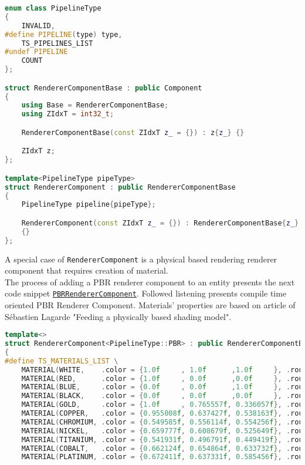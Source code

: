 \begin{itemize}
\begin{lstlisting}[language=c++, caption=Renderer Component struct (./engine/include/tsengine/ecs/components/renderer\_component.h)]
enum class PipelineType
{
    INVALID,
#define PIPELINE(type) type, 
    TS_PIPELINES_LIST
#undef PIPELINE
    COUNT
};

struct RendererComponentBase : public Component
{
    using Base = RendererComponentBase;
    using ZIdxT = int32_t;

    RendererComponentBase(const ZIdxT z_ = {}) : z{z_} {}

    ZIdxT z;
};

template<PipelineType pipeType>
struct RendererComponent : public RendererComponentBase 
{
    PipelineType pipeline{pipeType};

    RendererComponent(const ZIdxT z_ = {}) : RendererComponentBase{z_}
    {}
};
\end{lstlisting}

A special case of \texttt{RendererComponent} is a physical based rendering renderer component that requires creation of material.\\
The process of adding a PBR renderer component to an entity presents the next code snippet \hyperref[lst:renderer_component_pbr]{\texttt{PBRRendererComponent}}.
Followed listening presents compile time oriented PBR Renderer Component. Materials' properties are based on article of Sébastien Lagarde "Feeding a physically based shading model"\cite{feedingpbr}.
\label{lst:renderer_component_pbr}
\begin{lstlisting}[language=c++, caption=Renderer PBR component struct (./engine/include/tsengine/ecs/components/renderer\_component.h)]
template<>
struct RendererComponent<PipelineType::PBR> : public RendererComponentBase
{
#define TS_MATERIALS_LIST \
    MATERIAL(WHITE,    .color = {1.0f     , 1.0f      ,1.0f     }, .roughness = 0.5f, .metallic = 1.0f) \
    MATERIAL(RED,      .color = {1.0f     , 0.0f      ,0.0f     }, .roughness = 0.5f, .metallic = 1.0f) \
    MATERIAL(BLUE,     .color = {0.0f     , 0.0f      ,1.0f     }, .roughness = 0.5f, .metallic = 1.0f) \
    MATERIAL(BLACK,    .color = {0.0f     , 0.0f      ,0.0f     }, .roughness = 0.5f, .metallic = 1.0f) \
    MATERIAL(GOLD,     .color = {1.0f     , 0.765557f, 0.336057f}, .roughness = 0.5f, .metallic = 1.0f) \
    MATERIAL(COPPER,   .color = {0.955008f, 0.637427f, 0.538163f}, .roughness = 0.5f, .metallic = 1.0f) \
    MATERIAL(CHROMIUM, .color = {0.549585f, 0.556114f, 0.554256f}, .roughness = 0.5f, .metallic = 1.0f) \
    MATERIAL(NICKEL,   .color = {0.659777f, 0.608679f, 0.525649f}, .roughness = 0.5f, .metallic = 1.0f) \
    MATERIAL(TITANIUM, .color = {0.541931f, 0.496791f, 0.449419f}, .roughness = 0.5f, .metallic = 1.0f) \
    MATERIAL(COBALT,   .color = {0.662124f, 0.654864f, 0.633732f}, .roughness = 0.5f, .metallic = 1.0f) \
    MATERIAL(PLATINUM, .color = {0.672411f, 0.637331f, 0.585456f}, .roughness = 0.5f, .metallic = 1.0f) \


\end{lstlisting}
\end{itemize}
